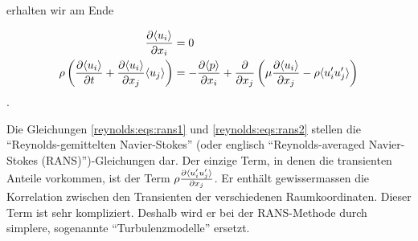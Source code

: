 erhalten wir am Ende

\begin{align}
    \label{reynolds:eqs:rans1}
    \frac{\partial \langle u_i \rangle}{\partial x_i} &= 0 \\
    \label{reynolds:eqs:rans2}
    \rho \left(
            \frac{\partial \langle u_i \rangle}{\partial t} +
            \frac{\partial \langle u_i \rangle}{\partial x_j} \langle u_j \rangle
        \right) &=
        - \frac{\partial \langle p \rangle}{\partial x_i} + 
            \frac{\partial}{\partial x_j} \left(
            \mu \frac{\partial \langle u_i \rangle}{\partial x_j} - \rho \langle u_i' u_j' \rangle
        \right)
\end{align}.

Die Gleichungen \ref{reynolds:eqs:rans1} und \ref{reynolds:eqs:rans2} stellen die
``Reynolds-gemittelten Navier-Stokes'' (oder englisch ``Reynolds-averaged
Navier-Stokes (RANS)'')-Gleichungen dar. Der einzige Term, in denen die transienten
Anteile vorkommen, ist der Term $\rho \frac{\partial \langle u_i' u_j' \rangle}{\partial x_j}$.
Er enthält gewissermassen die Korrelation zwischen den Transienten der verschiedenen
Raumkoordinaten. Dieser Term ist sehr kompliziert. Deshalb wird er bei der RANS-Methode
durch simplere, sogenannte ``Turbulenzmodelle'' ersetzt.
